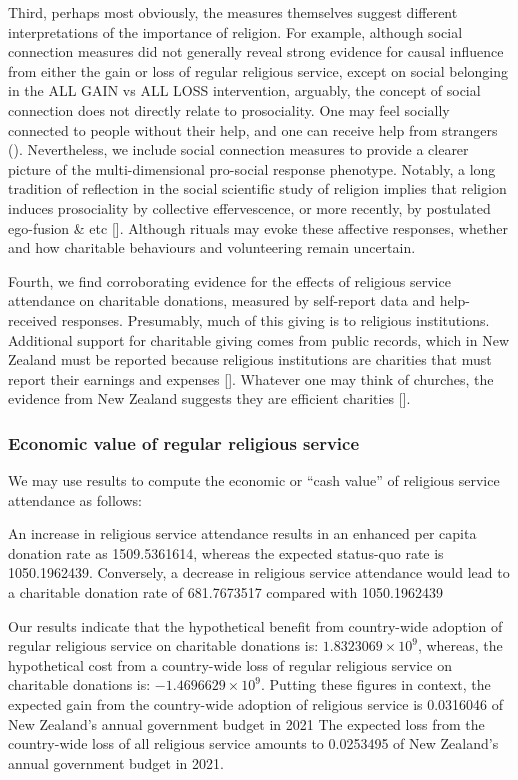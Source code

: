 \documentclass[
  singlecolumn]{article}
\begin{document}
Third, perhaps most obviously, the measures themselves suggest different
interpretations of the importance of religion. For example, although
social connection measures did not generally reveal strong evidence for
causal influence from either the gain or loss of regular religious
service, except on social belonging in the ALL GAIN vs ALL LOSS
intervention, arguably, the concept of social connection does not
directly relate to prosociality. One may feel socially connected to
people without their help, and one can receive help from strangers
(). Nevertheless,
we include social connection measures to provide a clearer picture of
the multi-dimensional pro-social response phenotype. Notably, a long
tradition of reflection in the social scientific study of religion
implies that religion induces prosociality by collective effervescence,
or more recently, by postulated ego-fusion \& etc {[}{]}. Although
rituals may evoke these affective responses, whether and how charitable
behaviours and volunteering remain uncertain.

Fourth, we find corroborating evidence for the effects of religious
service attendance on charitable donations, measured by self-report data
and help-received responses. Presumably, much of this giving is to
religious institutions. Additional support for charitable giving comes
from public records, which in New Zealand must be reported because
religious institutions are charities that must report their earnings and
expenses {[}{]}. Whatever one may think of churches, the evidence from
New Zealand suggests they are efficient charities {[}{]}.

\subsubsection{Economic value of regular religious
service}\label{economic-value-of-regular-religious-service}

We may use results to compute the economic or ``cash value'' of
religious service attendance as follows:

An increase in religious service attendance results in an enhanced per
capita donation rate as 1509.5361614, whereas the expected status-quo
rate is 1050.1962439. Conversely, a decrease in religious service
attendance would lead to a charitable donation rate of 681.7673517
compared with 1050.1962439

Our results indicate that the hypothetical benefit from country-wide
adoption of regular religious service on charitable donations is:
\ensuremath{1.8323069\times 10^{9}}, whereas, the hypothetical cost from
a country-wide loss of regular religious service on charitable donations
is: \ensuremath{-1.4696629\times 10^{9}}. Putting these figures in
context, the expected gain from the country-wide adoption of religious
service is 0.0316046 of New Zealand's annual government budget in 2021
The expected loss from the country-wide loss of all religious service
amounts to 0.0253495 of New Zealand's annual government budget in 2021.
\end{document}
